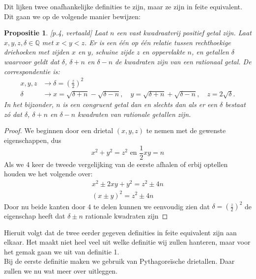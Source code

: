 \documentclass[12pt,reqno]{article}
\newcommand*{\QQ}{\ensuremath{\mathbb{Q}}}
\theoremstyle{theorem}
\newtheorem{proposition}[theorem]{Propositie}
\theoremstyle{definition}
\begin{document}
	Dit lijken twee onafhankelijke definities te zijn, maar ze zijn in feite equivalent. Dit gaan we op de volgende manier bewijzen: \\
	
	\begin{proposition}
			\cite{Koblitz}[p.4, vertaald] Laat $n$ een vast kwadraatvrij positief getal zijn. Laat $x,y,z,\delta \in\QQ$ met $x<y<z$. Er is een \'e\'en op \'e\'en relatie tussen rechthoekige driehoeken met zijden $x$ en $y$, schuine zijde $z$ en oppervlakte $n$, en getallen $\delta$ waarvoor geldt dat $\delta$, $\delta +n$ en $\delta -n$ de kwadraten zijn van een rationaal getal. De correspondentie is:
			\begin{align}
				x,y,z &\rightarrow \delta = \left( \frac{z}{2} \right)^2 \\
				\delta &\rightarrow x=\sqrt{\delta+n} - \sqrt{\delta-n},\quad y = \sqrt{\delta+n}+\sqrt{\delta-n},\quad z = 2\sqrt{\delta}.
			\end{align}
			In het bijzonder, $n$ is een congruent getal dan en slechts dan als er een $\delta$ bestaat z\'o dat $\delta$, $\delta+n$ en $\delta-n$ kwadraten van rationale getallen zijn.
		\end{proposition}
		\begin{proof}
			We beginnen door een drietal $(x,y,z)$ te nemen met de gewenste eigenschappen, dus
			\begin{equation*}
				x^2 + y^2 = z^2 \text{ en } \frac{1}{2}xy=n
			\end{equation*}
			Als we 4 keer de tweede vergelijking van de eerste afhalen of erbij optellen houden we het volgende over:
			\begin{align*}
				x^2 \pm 2xy + y^2 = z^2 \pm 4n \\
				(x \pm y)^2 = z^2 \pm 4n
			\end{align*}
			Door nu beide kanten door 4 te delen kunnen we eenvoudig zien dat $\delta = (\frac{z}{2})^2$ de eigenschap heeft dat $\delta \pm n$ rationale kwadraten zijn
		\end{proof}
		Hieruit volgt dat de twee eerder gegeven definities in feite equivalent zijn aan elkaar. Het maakt niet heel veel uit welke definitie wij zullen hanteren, maar voor het gemak gaan we uit van definitie 1. \\
	
	Bij de eerste definitie maken we gebruik van Pythagore\"ische drietallen. Daar zullen we nu wat meer over uitleggen.\\
	
\end{document}

